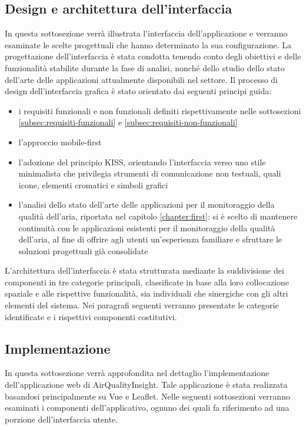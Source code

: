 \subsection{Design e architettura dell'interfaccia}

In questa sottosezione verrà illustrata l'interfaccia dell'applicazione e verranno esaminate le scelte progettuali
che hanno determinato la sua configurazione.
La progettazione dell'interfaccia è stata condotta tenendo conto degli obiettivi e delle funzionalità stabilite
durante la fase di analisi, nonché dello studio dello stato dell'arte delle applicazioni attualmente
disponibili nel settore.
Il processo di design dell'interfaccia grafica è stato orientato dai seguenti principi guida:
\begin{itemize}
  \item i requisiti funzionali e non funzionali definiti rispettivamente nelle sottosezioni
        \ref{subsec:requisiti-funzionali} e \ref{subsec:requisiti-non-funzionali}
  \item l'approccio mobile-first
  \item l'adozione del principio KISS, orientando l'interfaccia verso uno stile minimalista che privilegia strumenti
        di comunicazione non testuali, quali icone, elementi cromatici e simboli grafici
  \item l'analisi dello stato dell'arte delle applicazioni per il monitoraggio della qualità dell'aria,
        riportata nel capitolo \ref{chapter:first}: si è scelto di mantenere continuità
        con le applicazioni esistenti per il monitoraggio della qualità dell'aria, al fine di offrire agli utenti
        un'esperienza familiare e sfruttare le soluzioni progettuali già consolidate
\end{itemize}
L'architettura dell'interfaccia è stata strutturata mediante la suddivisione dei componenti
in tre categorie principali, classificate in base alla loro collocazione spaziale e alle rispettive funzionalità,
sia individuali che sinergiche con gli altri elementi del sistema.
Nei paragrafi seguenti verranno presentate le categorie identificate e i rispettivi componenti costitutivi.

\subsection{Implementazione}

In questa sottosezione verrà approfondita nel dettaglio l'implementazione dell'applicazione web di AirQualityInsight.
Tale applicazione è stata realizzata basandosi principalmente su Vue e Leaflet.
Nelle seguenti sottosezioni verranno esaminati i componenti dell'applicativo, ognuno dei quali fa riferimento
ad una porzione dell'interfaccia utente.

